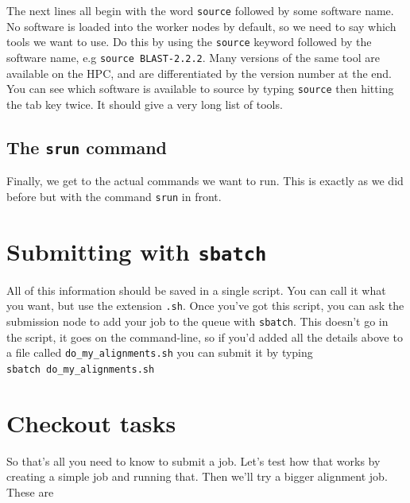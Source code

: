 \documentclass[]{book}
\begin{document}
The next lines all begin with the word \texttt{source} followed by some software name. No software is loaded into the worker nodes by default, so we need to say which tools we want to use. Do this by using the \texttt{source} keyword followed by the software name, e.g \texttt{source\ BLAST-2.2.2}. Many versions of the same tool are available on the HPC, and are differentiated by the version number at the end. You can see which software is available to source by typing \texttt{source} then hitting the tab key twice. It should give a very long list of tools.

\hypertarget{the-srun-command}{%
\subsection{\texorpdfstring{The \texttt{srun} command}{The srun command}}\label{the-srun-command}}

Finally, we get to the actual commands we want to run. This is exactly as we did before but with the command \texttt{srun} in front.

\hypertarget{submitting-with-sbatch}{%
\section{\texorpdfstring{Submitting with \texttt{sbatch}}{Submitting with sbatch}}\label{submitting-with-sbatch}}

All of this information should be saved in a single script. You can call it what you want, but use the extension \texttt{.sh}. Once you've got this script, you can ask the submission node to add your job to the queue with \texttt{sbatch}. This doesn't go in the script, it goes on the command-line, so if you'd added all the details above to a file called \texttt{do\_my\_alignments.sh} you can submit it by typing \texttt{sbatch\ do\_my\_alignments.sh}

\hypertarget{checkout-tasks}{%
\section{Checkout tasks}\label{checkout-tasks}}

So that's all you need to know to submit a job. Let's test how that works by creating a simple job and running that. Then we'll try a bigger alignment job. These are
\end{document}
